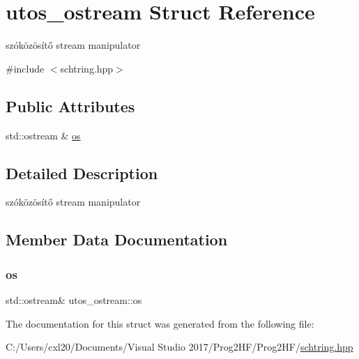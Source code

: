 \hypertarget{structutos__ostream}{}\section{utos\+\_\+ostream Struct Reference}
\label{structutos__ostream}


szóközösítő stream manipulator  




{\ttfamily \#include $<$schtring.\+hpp$>$}

\subsection*{Public Attributes}
\begin{DoxyCompactItemize}
\item 
std\+::ostream \& \mbox{\hyperlink{structutos__ostream_aec8d0c25d29aa2cea8ade1cfb60fb3ef}{os}}
\end{DoxyCompactItemize}


\subsection{Detailed Description}
szóközösítő stream manipulator 

\subsection{Member Data Documentation}
\mbox{\label{structutos__ostream_aec8d0c25d29aa2cea8ade1cfb60fb3ef}} 
\subsubsection{\texorpdfstring{os}{os}}
{\footnotesize\ttfamily std\+::ostream\& utos\+\_\+ostream\+::os}



The documentation for this struct was generated from the following file\+:\begin{DoxyCompactItemize}
\item 
C\+:/\+Users/cxl20/\+Documents/\+Visual Studio 2017/\+Prog2\+H\+F/\+Prog2\+H\+F/\mbox{\hyperlink{schtring_8hpp}{schtring.\+hpp}}\end{DoxyCompactItemize}
